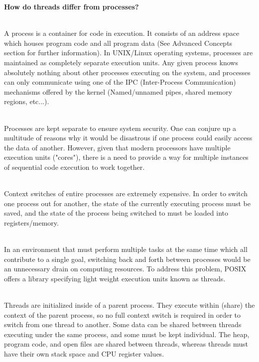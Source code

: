 \documentclass[12pt]{extarticle}
\newenvironment{myindentpar}[1]%
 {\begin{list}{}%
         {\setlength{\leftmargin}{#1}}%
         \item[]%
 }
 {\end{list}}
\begin{document}
\begin{myindentpar}{5mm}

    \noindent
    \textbf{How do threads differ from processes?}
    
    \vspace{-3mm}
    \ \\
    A process is a container for code in execution.  It consists of an address space which houses program code and all program data (See Advanced Concepts section for further information).  In UNIX/Linux operating systems, processes are maintained as completely separate execution units.  Any given process knows absolutely nothing about other processes executing on the system, and processes can only communicate using one of the IPC (Inter-Process Communication) mechanisms offered by the kernel (Named/unnamed pipes, shared memory regions, etc...).  
    
    \ \\
    Processes are kept separate to ensure system security.  One can conjure up a multitude of reasons why it would be disastrous if one process could easily access the data of another.  However, given that modern processors have multiple execution units ("cores"), there is a need to provide a way for multiple instances of sequential code execution to work together.  
    
    \ \\
    Context switches of entire processes are extremely expensive.  In order to switch one process out for another, the state of the currently executing process must be saved, and the state of the process being switched to must be loaded into registers/memory.  
    
    \ \\
    In an environment that must perform multiple tasks at the same time which all contribute to a single goal, switching back and forth between processes would be an unnecessary drain on computing resources.  To address this problem, POSIX offers a library specifying light weight execution units known as threads.  
    
    \ \\
    Threads are initialized inside of a parent process.  They execute within (share) the context of the parent process, so no full context switch is required in order to switch from one thread to another.  Some data can be shared between threads executing under the same process, and some must be kept individual.  The heap, program code, and open files are shared between threads, whereas threads must have their own stack space and CPU register values.  
    

\end{myindentpar}
\end{document}
